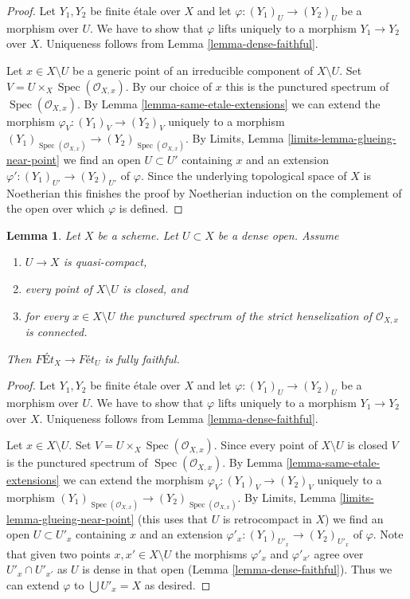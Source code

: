 \documentclass{stacks-project}
\theoremstyle{plain}
\newtheorem{lemma}[subsection]{Lemma}
\theoremstyle{definition}
\theoremstyle{remark}
\numberwithin{equation}{subsection}
\def\Spec{\mathop{\mathrm{Spec}}}
\begin{document}
\begin{proof}
Let $Y_1, Y_2$ be finite \'etale over $X$ and let
$\varphi : (Y_1)_U \to (Y_2)_U$ be a morphism over $U$. We have to show that
$\varphi$ lifts uniquely to a morphism $Y_1 \to Y_2$ over $X$.
Uniqueness follows from Lemma \ref{lemma-dense-faithful}.

\medskip\noindent
Let $x \in X \setminus U$ be a generic point of an irreducible component
of $X \setminus U$. Set $V = U \times_X \Spec(\mathcal{O}_{X, x})$.
By our choice of $x$ this is the punctured spectrum of
$\Spec(\mathcal{O}_{X, x})$. By
Lemma \ref{lemma-same-etale-extensions}
we can extend the morphism $\varphi_V : (Y_1)_V \to (Y_2)_V$
uniquely to a morphism
$(Y_1)_{\Spec(\mathcal{O}_{X, x})} \to (Y_2)_{\Spec(\mathcal{O}_{X, x})}$.
By Limits, Lemma \ref{limits-lemma-glueing-near-point}
we find an open $U \subset U'$ containing $x$ and an extension
$\varphi' : (Y_1)_{U'} \to (Y_2)_{U'}$ of $\varphi$.
Since the underlying topological space of $X$ is Noetherian
this finishes the proof by Noetherian induction on the complement
of the open over which $\varphi$ is defined.
\end{proof}

\begin{lemma}
\label{lemma-retrocompact-dense-open-connected-at-infinity-closed}
Let $X$ be a scheme. Let $U \subset X$ be a dense open. Assume
\begin{enumerate}
\item $U \to X$ is quasi-compact,
\item every point of $X \setminus U$ is closed, and
\item for every $x \in X \setminus U$ the punctured spectrum of the
strict henselization of $\mathcal{O}_{X, x}$ is connected.
\end{enumerate}
Then $\textit{F\'Et}_X \to \textit{F\'et}_U$ is fully faithful.
\end{lemma}

\begin{proof}
Let $Y_1, Y_2$ be finite \'etale over $X$ and let
$\varphi : (Y_1)_U \to (Y_2)_U$ be a morphism over $U$. We have to show that
$\varphi$ lifts uniquely to a morphism $Y_1 \to Y_2$ over $X$.
Uniqueness follows from Lemma \ref{lemma-dense-faithful}.

\medskip\noindent
Let $x \in X \setminus U$. Set $V = U \times_X \Spec(\mathcal{O}_{X, x})$.
Since every point of $X \setminus U$ is closed $V$ is the punctured spectrum
of $\Spec(\mathcal{O}_{X, x})$. By
Lemma \ref{lemma-same-etale-extensions}
we can extend the morphism $\varphi_V : (Y_1)_V \to (Y_2)_V$
uniquely to a morphism
$(Y_1)_{\Spec(\mathcal{O}_{X, x})} \to (Y_2)_{\Spec(\mathcal{O}_{X, x})}$.
By Limits, Lemma \ref{limits-lemma-glueing-near-point}
(this uses that $U$ is retrocompact in $X$)
we find an open $U \subset U'_x$ containing $x$ and an extension
$\varphi'_x : (Y_1)_{U'_x} \to (Y_2)_{U'_x}$ of $\varphi$.
Note that given two points $x, x' \in X \setminus U$ the
morphisms $\varphi'_x$ and $\varphi'_{x'}$ agree over
$U'_x \cap U'_{x'}$ as $U$ is dense in that open
(Lemma \ref{lemma-dense-faithful}). Thus we can extend $\varphi$
to $\bigcup U'_x = X$ as desired.
\end{proof}
\end{document}
